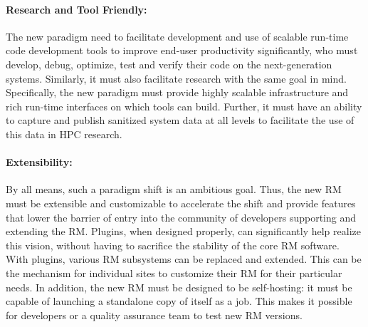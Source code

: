 \documentclass{article}
\newcommand{\ngrm}{NGRM}
\begin{document}
\paragraph{Research and Tool Friendly:}
The new paradigm need to facilitate development and use of 
scalable run-time code development tools to improve end-user productivity
significantly, who must develop, debug, optimize, 
test and verify their code on the next-generation systems. 
Similarly, it must
also facilitate research with the same goal in mind.
Specifically, the new paradigm must provide highly scalable infrastructure
and rich run-time interfaces
on which tools can build. Further, it must have 
an ability to capture and publish sanitized system data at all levels to facilitate the use of
this data in HPC research. 


\paragraph{Extensibility:}
By all means, such a paradigm shift is an ambitious goal. Thus, 
the new RM must be extensible and customizable to accelerate the shift
and provide features that lower the barrier of entry into the
community of developers supporting and extending the RM.
Plugins, when designed properly, can significantly help realize this vision,
without having to sacrifice the stability of the core RM software. 
With plugins, various RM subsystems can be replaced and extended.  
This can be the mechanism for individual
sites to customize their RM for their particular needs. 
In addition, the new RM must be designed to be self-hosting: it must  
be capable of launching a standalone copy of itself as a job. This makes
it possible for developers or a quality assurance team to test new RM versions. 

%
\end{document}
